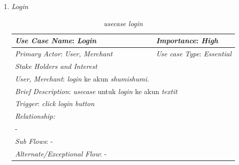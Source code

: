 \documentclass[a4paper]{article}
\begin{document}
\begin{enumerate}
\begin{enumerate}
        \item \textit{Login}
\begin{table}[h]
    \centering
    \caption{\textit{usecase login} }
    \begin{tabular}{|lll}
    \hline
    \multicolumn{1}{|l|}{\textit{Use Case Name}: \textit{Login}}             & \multicolumn{2}{l|}{\textit{Importance}: \textit{High}}   \\ \hline
    \multicolumn{1}{|l|}{\textit{Primary Actor}: \textit{User, Merchant}}             & \multicolumn{2}{l|}{\textit{Use case Type}: \textit{Essential}} \\ \hline
    \multicolumn{1}{|l|}{\textit{Stake Holders and Interest}} &                               &                               \\ \cline{1-1}
    \multicolumn{1}{|l|}{\textit{User, Merchant}: \textit{login} ke akun \textit{shumishumi}.}                                                     &                               &                               \\ \hline
    \multicolumn{3}{|l|}{\textit{Brief Description}: \textit{usecase} untuk \textit{login} ke akun \textit{textit}}                                                                         \\ \hline
    \multicolumn{3}{|l|}{\textit{Trigger}: \textit{click login button}}                                                                                   \\ \hline
    \multicolumn{3}{|l|}{\textit{Relationship:}}                                                                              \\ \hline
    \multicolumn{3}{|l|}{-}                                                                                                                     \\ \hline
    \multicolumn{3}{|l|}{\textit{Sub Flows}: -}                                                                                 \\ \hline
    \multicolumn{3}{|l|}{\textit{Alternate/Exceptional Flow}: -}                                                                \\ \hline
    \end{tabular}
\end{table}


\end{enumerate}
\end{enumerate}
\end{document}
